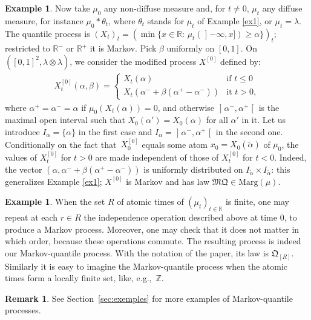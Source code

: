 \documentclass[11pt]{article}
\theoremstyle{plain}
\theoremstyle{definition}
\newtheorem{rem}[them]{Remark}
\newtheorem{ex}[them]{Example}
\newcommand{\como}{\mathfrak{Q}}
\newcommand{\mq}{\mathfrak{MQ}}
\newcommand{\la}{\lambda}
\newcommand{\ma}{\mathrm{Marg}}
\newcommand{\R}{\mathbb{R}}
\newcommand{\op}{\mathopen}
\newcommand{\clo}{\mathclose}
\begin{document}
\begin{ex}\label{ex2}Now take $\mu_0$ any non-diffuse measure and, for $t\neq 0$, $\mu_t$ any diffuse measure, for instance $\mu_0\ast \theta_t$, where $\theta_t$ stands for $\mu_t$ of Example \ref{ex1}, or $\mu_t=\la$. The quantile process is $(X_t)_t=(\min\{x\in \R:\,\mu_t(\op]-\infty,x])\geq \alpha\})_t$; restricted to $\R^-$ or $\R^+$ it is Markov. Pick $\beta$ uniformly on $[0,1]$. On $([0,1]^2,\la\otimes \la)$, we consider the modified process $X^{[0]}$ defined by:
\begin{align*}
X_t^{[0]}(\alpha,\beta)=
\begin{cases}
X_t(\alpha)&\text{if }t\leq 0\\
X_t(\alpha^-+\beta(\alpha^+-\alpha^-))&\text{it }t>0,
\end{cases}
\end{align*}
where $\alpha^+=\alpha^-=\alpha$ if $\mu_0(X_t(\alpha))=0$, and otherwise $\op]\alpha^-,\alpha^+\clo[$ is the maximal open interval such that $X_0(\alpha')=X_0(\alpha)$ for all $\alpha'$ in it. Let us introduce $I_\alpha=\{\alpha\}$ in the first case and $I_\alpha=\op]\alpha^-,\alpha^+\clo[$ in the second one. Conditionally on the fact that~$X_0^{[0]}$ equals some atom $x_0=X_0(\tilde\alpha)$ of $\mu_0$, the values of $X^{[0]}_t$ for $t>0$ are made independent of those of $X^{[0]}_t$ for $t<0$. Indeed, the vector $(\alpha,\alpha^- +\beta(\alpha^+-\alpha^-))$ is uniformly distributed on $I_{\tilde\alpha}\times I_{\tilde\alpha}$: this generalizes Example \ref{ex1}; $X^{[0]}$ is Markov and has law\/ $\mq\in \ma(\mu)$.
\end{ex}

\begin{ex}When the set $R$ of atomic times of $(\mu_t)_{t\in \R}$ is finite, one may repeat at each $r\in R$ the independence operation described above at time $0$, to produce a Markov process. Moreover, one may check that it does not matter in which order, \hbox{because} these operations commute. The resulting process is indeed our Markov-quantile process. With the notation of the paper, its law is $\como_{[R]}$. Similarly it is easy to imagine the Markov-quantile process when the atomic times form a locally finite set, like, e.g.,~$\mathbb{Z}$.
\end{ex}

\begin{rem} See Section~\ref{sec:exemples} for more examples of Markov-quantile processes.
\end{rem}
\end{document}
